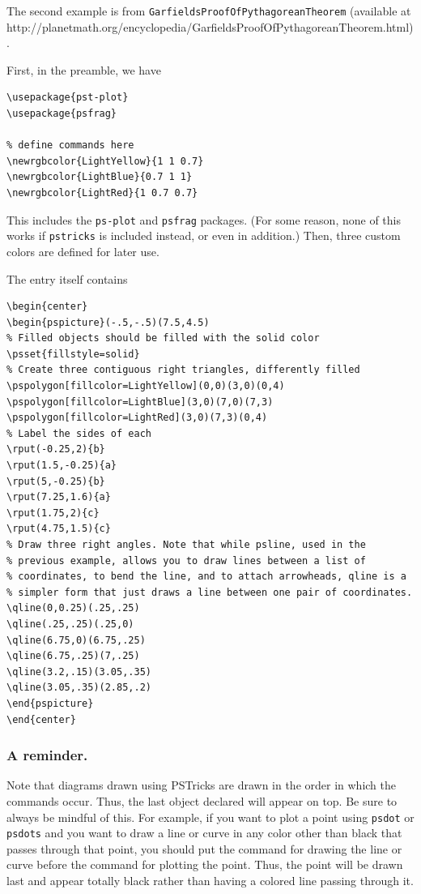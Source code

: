 The second example is from \texttt{GarfieldsProofOfPythagoreanTheorem} (available at  {http://planetmath.org/encyclopedia/GarfieldsProofOfPythagoreanTheorem.html}).

First, in the preamble, we have

\begin{Verbatim}
\usepackage{pst-plot}
\usepackage{psfrag}

% define commands here
\newrgbcolor{LightYellow}{1 1 0.7}
\newrgbcolor{LightBlue}{0.7 1 1}
\newrgbcolor{LightRed}{1 0.7 0.7}
\end{Verbatim}
This includes the \texttt{ps-plot} and \texttt{psfrag} packages. (For some reason, none of this works if \texttt{pstricks} is included instead, or even in addition.) Then, three custom colors are defined for later use.

The entry itself contains
\begin{Verbatim}
\begin{center}
\begin{pspicture}(-.5,-.5)(7.5,4.5)
% Filled objects should be filled with the solid color
\psset{fillstyle=solid}
% Create three contiguous right triangles, differently filled
\pspolygon[fillcolor=LightYellow](0,0)(3,0)(0,4)
\pspolygon[fillcolor=LightBlue](3,0)(7,0)(7,3)
\pspolygon[fillcolor=LightRed](3,0)(7,3)(0,4)
% Label the sides of each
\rput(-0.25,2){b}
\rput(1.5,-0.25){a}
\rput(5,-0.25){b}
\rput(7.25,1.6){a}
\rput(1.75,2){c}
\rput(4.75,1.5){c}
% Draw three right angles. Note that while psline, used in the
% previous example, allows you to draw lines between a list of
% coordinates, to bend the line, and to attach arrowheads, qline is a
% simpler form that just draws a line between one pair of coordinates.
\qline(0,0.25)(.25,.25)
\qline(.25,.25)(.25,0)
\qline(6.75,0)(6.75,.25)
\qline(6.75,.25)(7,.25)
\qline(3.2,.15)(3.05,.35)
\qline(3.05,.35)(2.85,.2)
\end{pspicture}
\end{center}
\end{Verbatim}

\subsubsection{A reminder.}

Note that diagrams drawn using PSTricks are drawn in the order in which the commands occur. Thus, the last object declared will appear on top. Be sure to always be mindful of this. For example, if you want to plot a point using \texttt{psdot} or \texttt{psdots} and you want to draw a line or curve in any color other than black that passes through that point, you should put the command for drawing the line or curve before the command for plotting the point. Thus, the point will be drawn last and appear totally black rather than having a colored line passing through it.

